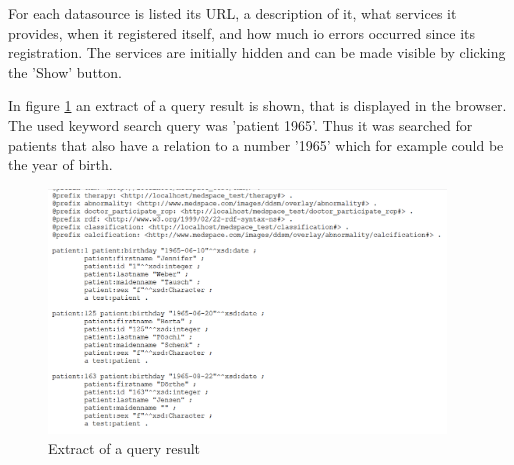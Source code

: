 For each datasource is listed its URL, a description of it, what services it provides, when it registered itself, and how much io errors occurred since its registration. The services are initially hidden and can be made visible by clicking the 'Show' button.

In figure \ref{MeDSpaceQueryResult} an extract of a query result is shown, that is displayed in the browser. The used keyword search query was 'patient 1965'. Thus it was searched for patients that also have a relation to a number '1965' which for example could be the year of birth.

\begin{figure}[H]
	\begin{center}
		\includegraphics[width=0.94\textwidth]{figures/MeDSpace-GUI-Query-Example.png}
	\end{center}
	\caption{Extract of a query result}
	\label{MeDSpaceQueryResult}
\end{figure}